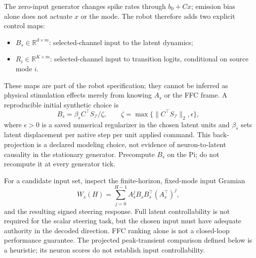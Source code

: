 The zero-input generator changes spike rates through $b_0+Cx$; emission bias alone does not actuate $x$ or the mode. The robot therefore adds two explicit control maps:
\begin{itemize}
\item $B_s\in\mathbb{R}^{d\times m}$: selected-channel input to the latent dynamics;
\item $R_i\in\mathbb{R}^{K\times m}$: selected-channel input to transition logits, conditional on source mode $i$.
\end{itemize}
These maps are part of the robot specification; they cannot be inferred as physical stimulation effects merely from knowing $A_s$ or the FFC frame. A reproducible initial synthetic choice is
\begin{equation}
 B_s=\beta_s C^{\top}S_{\mathcal I}/\zeta,\qquad
 \zeta=\max\{\|C^{\top}S_{\mathcal I}\|_2,\epsilon\},
 \label{eq:input-map}
\end{equation}
where $\epsilon>0$ is a saved numerical regularizer in the chosen latent units and $\beta_s$ sets latent displacement per native step per unit applied command. This back-projection is a declared modeling choice, not evidence of neuron-to-latent causality in the stationary generator. Precompute $B_s$ on the Pi; do not recompute it at every generator tick.

For a candidate input set, inspect the finite-horizon, fixed-mode input Gramian
\begin{equation}
 W_s(H)=\sum_{j=0}^{H-1} A_s^j B_sB_s^{\top}(A_s^{\top})^j,
 \label{eq:input-gramian}
\end{equation}
and the resulting signed steering response. Full latent controllability is not required for the scalar steering task, but the chosen input must have adequate authority in the decoded direction. FFC ranking alone is not a closed-loop performance guarantee. The projected peak-transient comparison defined below is a heuristic; its neuron scores do not establish input controllability.

